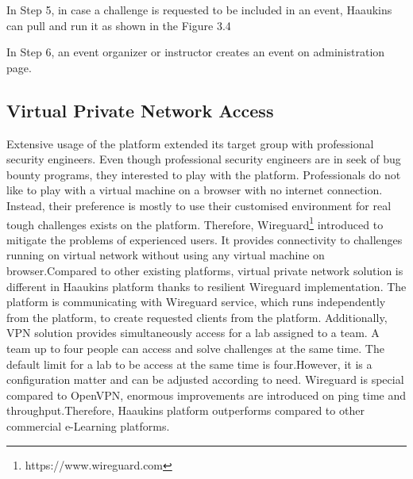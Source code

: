 In Step 5, in case a challenge is requested to be included in an event, Haaukins can pull and run it as shown in the Figure 3.4

In Step 6, an event organizer or instructor creates an event on administration page. 

\subsection{Virtual Private Network Access}
Extensive usage of the platform extended its target group with professional security engineers. Even though professional security engineers are in seek of bug bounty programs, they interested to play with the platform. Professionals do not like to play with a virtual machine on a browser with no internet connection. Instead, their preference is mostly to use their customised environment for real tough challenges exists on the platform. Therefore, Wireguard\footnote{https://www.wireguard.com} introduced to mitigate the problems of experienced users. It provides connectivity to challenges running on virtual network without using any virtual machine on browser.Compared to other existing platforms, virtual private network solution is different in Haaukins platform thanks to resilient Wireguard implementation. The platform is communicating with Wireguard service, which runs independently from the platform, to create requested clients from the platform. 
Additionally, VPN solution provides simultaneously access for a lab assigned to a team. A team up to four people can access and solve challenges at the same time. The default limit for a lab to be access at the same time is four.However, it is a configuration matter and can be adjusted according to need. 
Wireguard is special compared to OpenVPN, enormous improvements are introduced on ping time and throughput\cite{wireguard}.Therefore, Haaukins platform outperforms compared to other commercial e-Learning platforms. 


